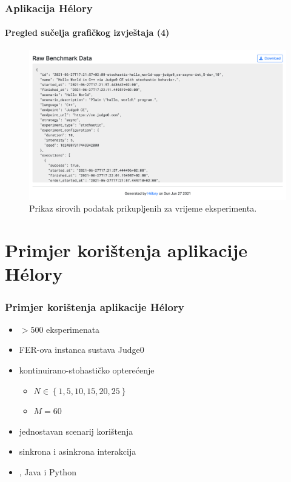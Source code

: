 \documentclass{beamer}
\newif\ifplacelogo
\begin{document}
\placelogofalse
\begin{frame}
\frametitle{Aplikacija Hélory}
\framesubtitle{Pregled sučelja grafičkog izvještaja (4)}
\begin{figure}[htb]
	\centering
	\includegraphics[width=\textwidth]{images/Report UI 4.png}
	\caption{
		Prikaz sirovih podatak prikupljenih za vrijeme eksperimenta.
	}
\end{figure}
\end{frame}
\placelogotrue

\section{Primjer korištenja aplikacije Hélory}
\begin{frame}
\frametitle{Primjer korištenja aplikacije Hélory}
\begin{itemize}
	\item $> 500$ eksperimenata
	\item FER-ova instanca sustava Judge0 
	\item kontinuirano-stohastičko opterećenje
	\begin{itemize}
		\item $N \in \left\{1,5,10,15,20,25\right\}$
		\item $M=60$
	\end{itemize}
	\item jednostavan scenarij korištenja
	\item sinkrona i asinkrona interakcija
	\item {}, Java i Python
\end{itemize}
\end{frame}
\end{document}
